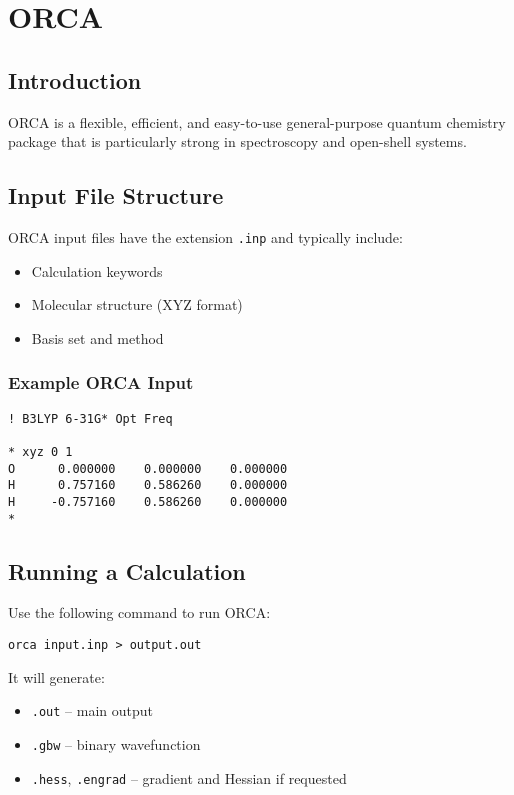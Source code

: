 \chapter{ORCA}

\section{Introduction}

ORCA is a flexible, efficient, and easy-to-use general-purpose quantum chemistry package that is particularly strong in spectroscopy and open-shell systems.

\section{Input File Structure}

ORCA input files have the extension \texttt{.inp} and typically include:

\begin{itemize}
    \item Calculation keywords
    \item Molecular structure (XYZ format)
    \item Basis set and method
\end{itemize}

\subsection*{Example ORCA Input}

\begin{verbatim}
! B3LYP 6-31G* Opt Freq

* xyz 0 1
O      0.000000    0.000000    0.000000
H      0.757160    0.586260    0.000000
H     -0.757160    0.586260    0.000000
*
\end{verbatim}

\section{Running a Calculation}

Use the following command to run ORCA:

\begin{verbatim}
orca input.inp > output.out
\end{verbatim}

It will generate:
\begin{itemize}
    \item \texttt{.out} – main output
    \item \texttt{.gbw} – binary wavefunction
    \item \texttt{.hess}, \texttt{.engrad} – gradient and Hessian if requested
\end{itemize}

